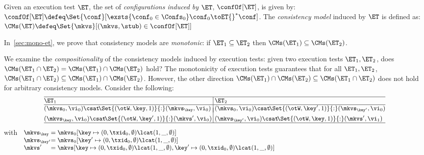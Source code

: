 \begin{definition}
\label{def:cm}
Given an execution test $\ET$,  
the set of \emph{configurations induced by $\ET$},  $\confOf[\ET]$, is   given by: 
\(
\confOf[\ET] \defeq 
\Set{\conf}[ 
\exsts{\conf_0 \in \Confs_0}
\conf_0 \toET{}^{*} \conf
]
\).
The \emph{consistency model} induced by $\ET$ is defined as:
\( 
\CMs(\ET) \defeq \Set{ \mkvs }[ (\mkvs, \stub) \in \confOf[\ET] ]
\)
\end{definition}


\noindent In~\cref{sec:mono-et}, we prove that consistency models are 
\emph{monotonic}: 
if  $\ET_1 \subseteq \ET_2$ then $\CMs(\ET_1) \subseteq \CMs(\ET_2)$.

We examine the \emph{compositionality} of the consistency models induced by execution tests:  
\ie given two execution tests $\ET_1, \ET_2$, does 
$\CMs(\ET_1 \cap \ET_2) = \CMs(\ET_1) \cap \CMs(\ET_2)$ hold? 
The monotonicity of execution tests guarantees that 
 for all $\ET_1, \ET_2$, \( \CMs(\ET_1 \cap \ET_2) \subseteq \CMs(\ET_1) \cap \CMs(\ET_2) \). 
However, the other direction \( \CMs(\ET_1) \cap \CMs(\ET_2) \subseteq \CMs(\ET_1 \cap \ET_2) \) does not hold for arbitrary consistency models.
Consider the following:
%
\[
\small
\begin{array}{@{}l @{\hspace{2pt}} | @{\hspace{2pt}} l@{}}
    \hline
    \ET_1 & \ET_2 \\
%    
    \hline
    (\mkvs_{0}, \vi_{0}) \csat\! \Set{(\otW, \key, 1)} {:} ( \mkvs_{\key}, \vi_{0})
    &
    (\mkvs_{0}, \vi_{0}) \csat\! \Set{(\otW, \key', 1)} {:} ( \mkvs_{\key'}, \vi_{0}) 
    \vspace*{-7pt}\\\\
    (\mkvs_{\key}, \vi_{0}) \csat  \!\Set{(\otW, \key', 1)} {:} (\mkvs',\vi_{0}) 
    &
    (\mkvs_{\key'}, \vi_{0}) \csat \!\Set{(\otW, \key, 1)} {:} (\mkvs',\vi_{1}) 
    \\
\hline
\end{array}
\]%
%
with%
%
{
\(
\small
\begin{array}[t]{l@{} l}
    \mkvs_{\key} & = \mkvs_{0}[\key \mapsto (0, \txid_{0}, \emptyset) \lcat (1, \_, \emptyset)] \\
    \mkvs_{\key'} & = \mkvs_{0}[\key' \mapsto (0, \txid_{0}, \emptyset) \lcat (1, \_, \emptyset)] \\
    \mkvs' & = \mkvs[\key \mapsto (0, \txid_{0}, \emptyset) \lcat (1, \_, \emptyset) 
                ,\key' \mapsto (0, \txid_{0}, \emptyset) \lcat (1, \_, \emptyset)] \\
\end{array}
\)%
}%
%

